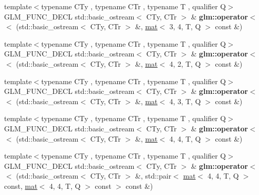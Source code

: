 \begin{DoxyCompactItemize}
\item 
\mbox{\label{group__gtx__io_gaa6f5541be2f182df05341e1d254c9a93}} 
{\footnotesize template$<$typename C\+Ty , typename C\+Tr , typename T , qualifier Q$>$ }\\G\+L\+M\+\_\+\+F\+U\+N\+C\+\_\+\+D\+E\+CL std\+::basic\+\_\+ostream$<$ C\+Ty, C\+Tr $>$ \& {\bfseries glm\+::operator$<$$<$} (std\+::basic\+\_\+ostream$<$ C\+Ty, C\+Tr $>$ \&, \hyperlink{structglm_1_1mat}{mat}$<$ 3, 4, T, Q $>$ const \&)
\item 
\mbox{\label{group__gtx__io_gae565f5723d3912d17e295953290fd04b}} 
{\footnotesize template$<$typename C\+Ty , typename C\+Tr , typename T , qualifier Q$>$ }\\G\+L\+M\+\_\+\+F\+U\+N\+C\+\_\+\+D\+E\+CL std\+::basic\+\_\+ostream$<$ C\+Ty, C\+Tr $>$ \& {\bfseries glm\+::operator$<$$<$} (std\+::basic\+\_\+ostream$<$ C\+Ty, C\+Tr $>$ \&, \hyperlink{structglm_1_1mat}{mat}$<$ 4, 2, T, Q $>$ const \&)
\item 
\mbox{\label{group__gtx__io_ga203dc1828e9c231fed8dc8c000db2e17}} 
{\footnotesize template$<$typename C\+Ty , typename C\+Tr , typename T , qualifier Q$>$ }\\G\+L\+M\+\_\+\+F\+U\+N\+C\+\_\+\+D\+E\+CL std\+::basic\+\_\+ostream$<$ C\+Ty, C\+Tr $>$ \& {\bfseries glm\+::operator$<$$<$} (std\+::basic\+\_\+ostream$<$ C\+Ty, C\+Tr $>$ \&, \hyperlink{structglm_1_1mat}{mat}$<$ 4, 3, T, Q $>$ const \&)
\item 
\mbox{\label{group__gtx__io_ga269b4fa07fb9fe97faee573e9ccd9306}} 
{\footnotesize template$<$typename C\+Ty , typename C\+Tr , typename T , qualifier Q$>$ }\\G\+L\+M\+\_\+\+F\+U\+N\+C\+\_\+\+D\+E\+CL std\+::basic\+\_\+ostream$<$ C\+Ty, C\+Tr $>$ \& {\bfseries glm\+::operator$<$$<$} (std\+::basic\+\_\+ostream$<$ C\+Ty, C\+Tr $>$ \&, \hyperlink{structglm_1_1mat}{mat}$<$ 4, 4, T, Q $>$ const \&)
\item 
\mbox{\label{group__gtx__io_gae88c98b45bbff402d42b08bcea9922cb}} 
{\footnotesize template$<$typename C\+Ty , typename C\+Tr , typename T , qualifier Q$>$ }\\G\+L\+M\+\_\+\+F\+U\+N\+C\+\_\+\+D\+E\+CL std\+::basic\+\_\+ostream$<$ C\+Ty, C\+Tr $>$ \& {\bfseries glm\+::operator$<$$<$} (std\+::basic\+\_\+ostream$<$ C\+Ty, C\+Tr $>$ \&, std\+::pair$<$ \hyperlink{structglm_1_1mat}{mat}$<$ 4, 4, T, Q $>$ const, \hyperlink{structglm_1_1mat}{mat}$<$ 4, 4, T, Q $>$ const $>$ const \&)
\end{DoxyCompactItemize}



